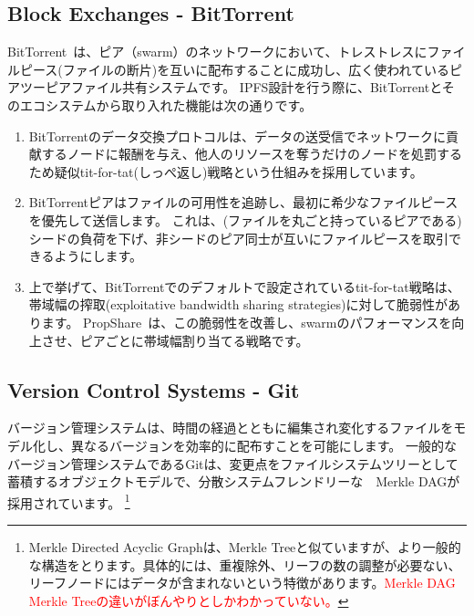 \documentclass{sig-alternate}
\begin{document}
\subsection{Block Exchanges - BitTorrent}

BitTorrent~\cite{cohen03}は、ピア（swarm）のネットワークにおいて、トレストレスにファイルピース(ファイルの断片)を互いに配布することに成功し、広く使われているピアツーピアファイル共有システムです。 IPFS設計を行う際に、BitTorrentとそのエコシステムから取り入れた機能は次の通りです。

\begin{enumerate}
  \item BitTorrentのデータ交換プロトコルは、データの送受信でネットワークに貢献するノードに報酬を与え、他人のリソースを奪うだけのノードを処罰するため疑似tit-for-tat(しっぺ返し)戦略という仕組みを採用しています。

  \item  BitTorrentピアはファイルの可用性を追跡し、最初に希少なファイルピースを優先して送信します。 これは、(ファイルを丸ごと持っているピアである)シードの負荷を下げ、非シードのピア同士が互いにファイルピースを取引できるようにします。

  \item 上で挙げて、BitTorrentでのデフォルトで設定されているtit-for-tat戦略は、帯域幅の搾取(exploitative bandwidth sharing strategies)に対して脆弱性があります。 PropShare~\cite{levin08}は、この脆弱性を改善し、swarmのパフォーマンスを向上させ、ピアごとに帯域幅割り当てる戦略です。
\end{enumerate}

\subsection{Version Control Systems - Git}
バージョン管理システムは、時間の経過とともに編集され変化するファイルをモデル化し、異なるバージョンを効率的に配布すことを可能にします。 一般的なバージョン管理システムであるGitは、変更点をファイルシステムツリーとして蓄積するオブジェクトモデルで、分散システムフレンドリーな　Merkle DAGが採用されています。 \footnote {Merkle Directed Acyclic Graphは、Merkle Treeと似ていますが、より一般的な構造をとります。具体的には、重複除外、リーフの数の調整が必要ない、リーフノードにはデータが含まれないという特徴があります。\textcolor{red}{Merkle DAG Merkle Treeの違いがぼんやりとしかわかっていない。}}
\end{document}
